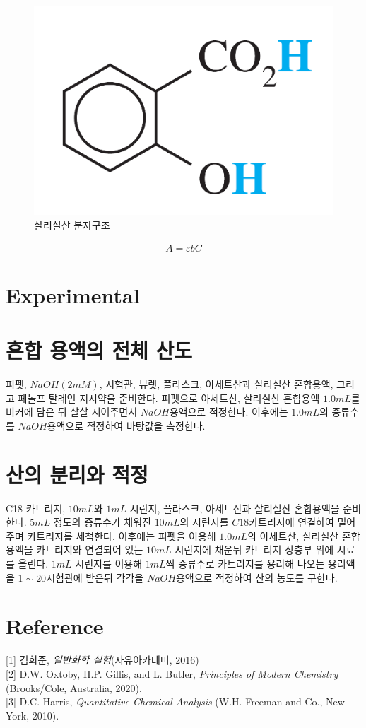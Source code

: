 \documentclass[%
 reprint,
 amsmath,amssymb,
 aps,
]{revtex4-2}
\begin{document}
\begin{figure}[htbp]
	\includegraphics[width = 0.6\linewidth]{saly.png}%
	\caption{\label{fig:saly}살리실산 분자구조}
\end{figure}

\begin{align}
	A = \varepsilon b C
\end{align}

\section{\label{sec:level1}Experimental}
\section{\label{sec:level2}혼합 용액의 전체 산도}
피펫, $NaOH (2mM)$, 시험관, 뷰렛, 플라스크, 아세트산과 살리실산 혼합용액, 그리고 페놀프 탈레인 지시약을 준비한다. 피펫으로 아세트산, 살리실산 혼합용액 $1.0mL$를 비커에 담은 뒤 살살 저어주면서 $NaOH$용액으로 적정한다. 이후에는 $1.0mL$의 증류수를 $NaOH$용액으로 적정하여 바탕값을 측정한다.

\section{\label{sec:level2}산의 분리와 적정}
C18 카트리지, $10mL$와 $1mL$ 시린지, 플라스크, 아세트산과 살리실산 혼합용액을 준비한다. $5mL$ 정도의 증류수가 채워진 $10mL$의 시린지를 $C18$카트리지에 연결하여 밀어주며 카트리지를 세척한다. 이후에는 피펫을 이용해 $1.0mL$의 아세트산, 살리실산 혼합용액을 카트리지와 연결되어 있는 $10mL$ 시린지에 채운뒤 카트리지 상층부 위에 시료를 올린다. $1mL$ 시린지를 이용해 $1mL$씩 증류수로 카트리지를 용리해 나오는 용리액을 $1\sim 20$시험관에 받은뒤 각각을 $NaOH$용액으로 적정하여 산의 농도를 구한다.

\section{\label{sec:level1}Reference}
[1] 김희준, \textit{일반화학 실험}(자유아카데미, 2016)\\

[2] D.W. Oxtoby, H.P. Gillis, and L. Butler, \textit{Principles of Modern Chemistry} (Brooks/Cole, Australia, 2020). \\

[3] D.C. Harris, \textit{Quantitative Chemical Analysis} (W.H. Freeman and Co., New York, 2010). 
\end{document}
